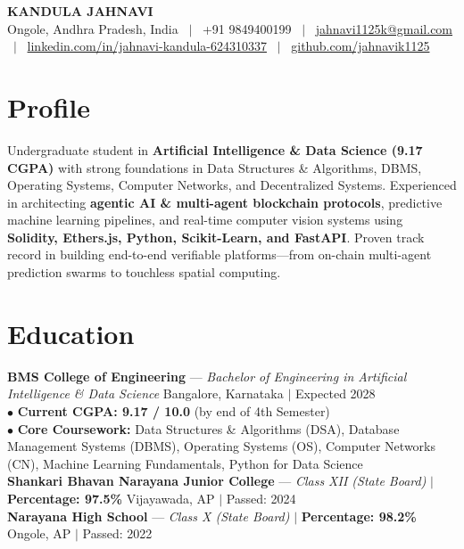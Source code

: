 \documentclass[a4paper,10pt]{article}
\begin{document}
\begin{center}
    {\LARGE \textbf{KANDULA JAHNAVI}}\\[3pt]
    \small Ongole, Andhra Pradesh, India \ $|$ \ +91 9849400199 \ $|$ \ \href{mailto:jahnavi1125k@gmail.com}{jahnavi1125k@gmail.com} \ $|$ \ \href{https://linkedin.com/in/jahnavi-kandula-624310337}{linkedin.com/in/jahnavi-kandula-624310337} \ $|$ \ \href{https://github.com/jahnavik1125}{github.com/jahnavik1125}
\end{center}

\section{Profile}
\small Undergraduate student in \textbf{Artificial Intelligence \& Data Science (9.17 CGPA)} with strong foundations in Data Structures \& Algorithms, DBMS, Operating Systems, Computer Networks, and Decentralized Systems. Experienced in architecting \textbf{agentic AI \& multi-agent blockchain protocols}, predictive machine learning pipelines, and real-time computer vision systems using \textbf{Solidity, Ethers.js, Python, Scikit-Learn, and FastAPI}. Proven track record in building end-to-end verifiable platforms---from on-chain multi-agent prediction swarms to touchless spatial computing.

\section{Education}
\textbf{BMS College of Engineering} --- \textit{Bachelor of Engineering in Artificial Intelligence \& Data Science} \hfill Bangalore, Karnataka $|$ Expected 2028\\
$\bullet$ \textbf{Current CGPA: 9.17 / 10.0} (by end of 4th Semester)\\
$\bullet$ \textbf{Core Coursework:} Data Structures \& Algorithms (DSA), Database Management Systems (DBMS), Operating Systems (OS), Computer Networks (CN), Machine Learning Fundamentals, Python for Data Science\\[3pt]
\textbf{Shankari Bhavan Narayana Junior College} --- \textit{Class XII (State Board)} $|$ \textbf{Percentage: 97.5\%} \hfill Vijayawada, AP $|$ Passed: 2024\\
\textbf{Narayana High School} --- \textit{Class X (State Board)} $|$ \textbf{Percentage: 98.2\%} \hfill Ongole, AP $|$ Passed: 2022

\end{document}
